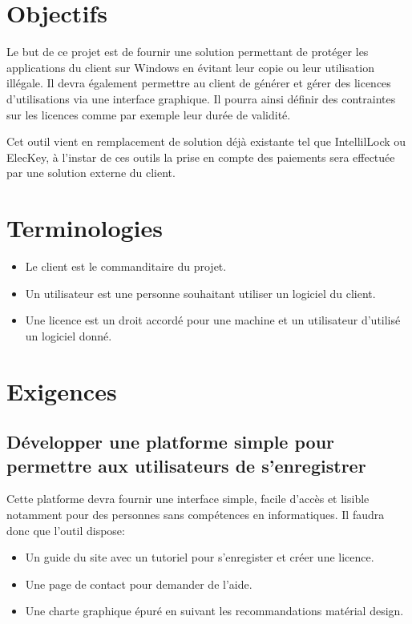 \chapter{Objectifs}

Le but de ce projet est de fournir une solution permettant de protéger les applications
du client sur Windows en évitant leur copie ou leur utilisation illégale. 
Il devra également permettre au client de générer et gérer des licences d'utilisations 
via une interface graphique. Il pourra ainsi définir des contraintes sur les licences 
comme par exemple leur durée de validité. \newline

Cet outil vient en remplacement de solution déjà existante tel que IntellilLock ou ElecKey,
à l'instar de ces outils la prise en compte des paiements sera effectuée par une solution externe
du client.

\chapter{Terminologies}

\begin{itemize}
	\item Le client est le commanditaire du projet.
	\item Un utilisateur est une personne souhaitant utiliser un logiciel du client. 
	\item Une licence est un droit accordé pour une machine et un utilisateur d'utilisé un logiciel donné.
\end{itemize}

\chapter{Exigences}

\section{Développer une platforme simple pour permettre aux utilisateurs de s'enregistrer}
Cette platforme devra fournir une interface simple, facile d'accès et lisible notamment 
pour des personnes sans compétences en informatiques. Il faudra donc que l'outil dispose:
\begin{itemize}
	\item Un guide du site avec un tutoriel pour s'enregister et créer une licence.
	\item Une page de contact pour demander de l'aide.
	\item Une charte graphique épuré en suivant les recommandations matérial design.
\end{itemize}

